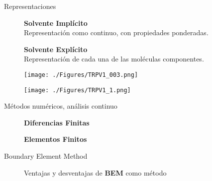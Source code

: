 \documentclass[usenames,dvipsnames,landscape]{beamer}
\begin{document}
\begin{frame}{Representaciones}
	\begin{figure}
		\begin{minipage}{0.34\slidewidth}
			{\Large \textbf{Solvente Implícito}}\\[0.5cm]
			Representación como continuo, con propiedades ponderadas.
		\end{minipage}%
		\begin{minipage}{0.1\slidewidth}
			\hspace*{0.5cm}
		\end{minipage}%
		\begin{minipage}{0.33\slidewidth}
			{\Large \textbf{Solvente Explícito}}\\[0.5cm]
			Representación de cada una de las moléculas componentes.
		\end{minipage}\vspace{0.5cm}
		\begin{minipage}{0.4\slidewidth}
			\hspace*{5pt}
			\texttt{[image: ./Figures/TRPV1\_003.png]}
		\end{minipage}%
		\begin{minipage}{0.4\slidewidth}
			\hspace*{10pt}
			\texttt{[image: ./Figures/TRPV1\_1.png]}
		\end{minipage}
	\end{figure}
\end{frame}

\begin{frame}{Métodos numéricos, análisis continuo}
	\begin{figure}
		\begin{minipage}{0.4\slidewidth}
				{\Large\textbf{Diferencias Finitas}}\\[0.5cm]
		\end{minipage}%
		\begin{minipage}{0.4\slidewidth}
			{\Large \textbf{Elementos Finitos}}\\[0.5cm]
		\end{minipage}
	\end{figure}
\end{frame}

\begin{frame}{Boundary Element Method}
	\begin{figure}
		\begin{minipage}{0.8\slidewidth}
			\Large{Ventajas y desventajas de \textbf{BEM} como método}
		\end{minipage}
		\vspace{-1cm}
		\begin{minipage}{0.4\slidewidth}
			
		\end{minipage}
	\end{figure}
\end{frame}
\end{document}
